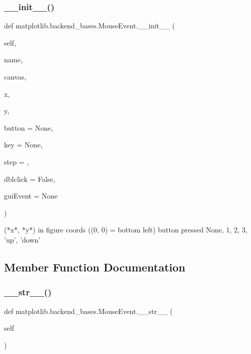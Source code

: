 \subsubsection{\texorpdfstring{\+\_\+\+\_\+init\+\_\+\+\_\+()}{\_\_init\_\_()}}
{\footnotesize\ttfamily def matplotlib.\+backend\+\_\+bases.\+Mouse\+Event.\+\_\+\+\_\+init\+\_\+\+\_\+ (\begin{DoxyParamCaption}\item[{}]{self,  }\item[{}]{name,  }\item[{}]{canvas,  }\item[{}]{x,  }\item[{}]{y,  }\item[{}]{button = {\ttfamily None},  }\item[{}]{key = {\ttfamily None},  }\item[{}]{step = {},  }\item[{}]{dblclick = {\ttfamily False},  }\item[{}]{gui\+Event = {\ttfamily None} }\end{DoxyParamCaption})}

\begin{DoxyVerb}(*x*, *y*) in figure coords ((0, 0) = bottom left)
button pressed None, 1, 2, 3, 'up', 'down'
\end{DoxyVerb}
 

\subsection{Member Function Documentation}
\mbox{\label{classmatplotlib_1_1backend__bases_1_1MouseEvent_a3449be2a850a789e771d608fe711e771}} 
\subsubsection{\texorpdfstring{\+\_\+\+\_\+str\+\_\+\+\_\+()}{\_\_str\_\_()}}
{\footnotesize\ttfamily def matplotlib.\+backend\+\_\+bases.\+Mouse\+Event.\+\_\+\+\_\+str\+\_\+\+\_\+ (\begin{DoxyParamCaption}\item[{}]{self }\end{DoxyParamCaption})}



